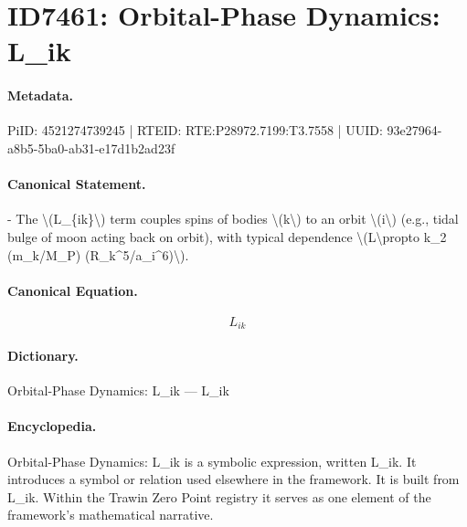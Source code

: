 \section*{ID7461: Orbital-Phase Dynamics: L\_ik}
\paragraph{Metadata.}
PiID: 4521274739245 | RTEID: RTE:P28972.7199:T3.7558 | UUID: 93e27964-a8b5-5ba0-ab31-e17d1b2ad23f

\paragraph{Canonical Statement.}
- The \textbackslash{}(L\_\{ik\}\textbackslash{}) term couples spins of bodies \textbackslash{}(k\textbackslash{}) to an orbit \textbackslash{}(i\textbackslash{}) (e.g., tidal bulge of moon acting back on orbit), with typical dependence \textbackslash{}(L\textbackslash{}propto k\_2 (m\_k/M\_P) (R\_k\textasciicircum{}5/a\_i\textasciicircum{}6)\textbackslash{}).

\paragraph{Canonical Equation.}
\[
L_{ik}
\]

\paragraph{Dictionary.}
Orbital-Phase Dynamics: L\_ik — L\_ik

\paragraph{Encyclopedia.}
Orbital-Phase Dynamics: L\_ik is a symbolic expression, written L\_ik. It introduces a symbol or relation used elsewhere in the framework. It is built from L\_ik. Within the Trawin Zero Point registry it serves as one element of the framework's mathematical narrative.
